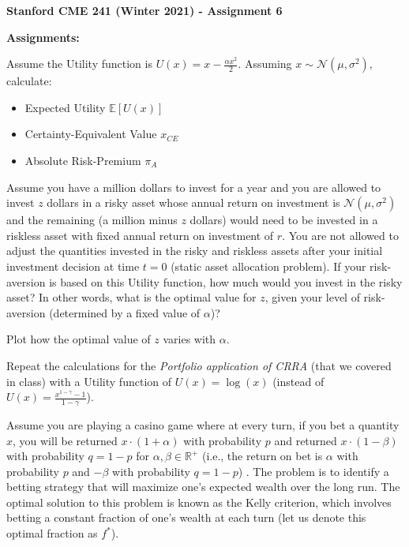 \documentclass[12pt]{exam}
\begin{document}
\begin{center}
{\large {\bf Stanford CME 241 (Winter 2021) - Assignment 6}}
\end{center}
 
{\large{\bf Assignments:}}
\begin{questions}
\question Assume the Utility function is $U(x) = x - \frac {\alpha x^2} 2$. Assuming $x \sim \mathcal{N}(\mu, \sigma^2)$, calculate:
\begin{itemize}
\item Expected Utility $\mathbb{E}[U(x)]$
\item Certainty-Equivalent Value $x_{CE}$
\item Absolute Risk-Premium $\pi_A$	
\end{itemize}
Assume you have a million dollars to invest for a year and you are allowed to invest $z$ dollars in a risky asset whose annual return on investment is $\mathcal{N}(\mu, \sigma^2)$ and the remaining (a million minus $z$ dollars) would need to be invested in a riskless asset with fixed annual return on investment of $r$. You are not allowed to adjust the quantities invested in the risky and riskless assets after your initial investment decision at time $t=0$ (static asset allocation problem). If your risk-aversion is based on this Utility function, how much would you invest in the risky asset? In other words, what is the optimal value for $z$, given your level of risk-aversion (determined by a fixed value of $\alpha$)?

Plot how the optimal value of $z$ varies with $\alpha$.

 Repeat the calculations for the {\em Portfolio application of CRRA} (that we covered in class) with a Utility function of $U(x) = \log(x)$ (instead of $U(x) = \frac {x^{1 - \gamma} - 1} {1 - \gamma}$).

\question Assume you are playing a casino game where at every turn, if you bet a quantity $x$, you will be returned $x \cdot (1 + \alpha)$ with probability $p$ and returned $x \cdot (1 - \beta)$ with probability $q = 1 - p$ for $\alpha, \beta \in \mathbb{R}^+$ (i.e., the return on bet is $\alpha$ with probability $p$ and $-\beta$ with probability $q = 1-p$) . The problem is to identify a betting strategy that will maximize one's expected wealth over the long run. The optimal solution to this problem is known as the Kelly criterion, which involves betting a constant fraction of one's wealth at each turn (let us denote this optimal fraction as $f^*$).


\end{questions}
\end{document}
